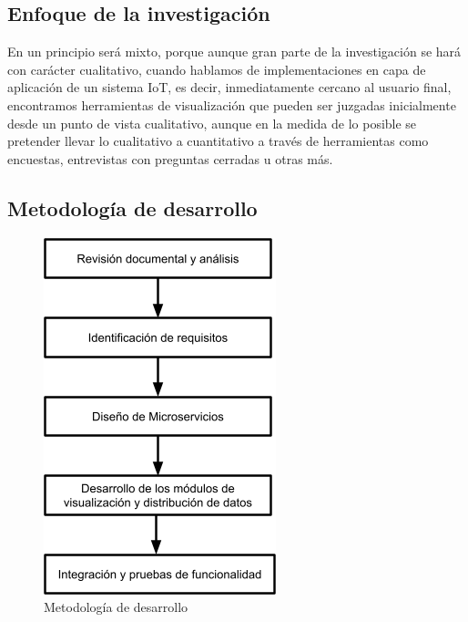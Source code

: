 \documentclass[stu,12pt,floatsintext]{apa7}
\begin{document}
	\subsection{Enfoque de la investigación}
	En un principio será mixto, porque aunque gran parte de la investigación se hará con carácter cualitativo, cuando hablamos de implementaciones en capa de aplicación de un sistema IoT, es decir, inmediatamente cercano al usuario final, encontramos herramientas de visualización que pueden ser juzgadas inicialmente desde un punto de vista cualitativo, aunque en la medida de lo posible se pretender llevar lo cualitativo a cuantitativo a través de herramientas como encuestas, entrevistas con preguntas cerradas u otras más.
	\subsection{Metodología de desarrollo}
		\begin{figure}[H]
		\centering
		\includegraphics[scale=0.8]{metodologia.png}
		\captionsetup{justification=centering}
		\caption{Metodología de desarrollo}
		\small
		\label{TRIZ}
	\end{figure}
	
\end{document}
